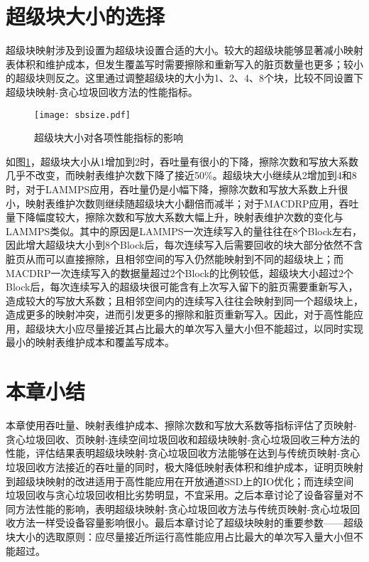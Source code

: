 \section{超级块大小的选择}

超级块映射涉及到设置为超级块设置合适的大小。较大的超级块能够显著减小映射表体积和维护成本，但发生覆盖写时需要擦除和重新写入的脏页数量也更多；较小的超级块则反之。这里通过调整超级块的大小为1、2、4、8个块，比较不同设置下超级块映射-贪心垃圾回收方法的性能指标。

\begin{figure}[H]
    \centering
    \texttt{[image: sbsize.pdf]}
    \caption{超级块大小对各项性能指标的影响}
    \label{fig:res_sbsize}
\end{figure}

如图\ref{fig:res_sbsize}，超级块大小从1增加到2时，吞吐量有很小的下降，擦除次数和写放大系数几乎不改变，而映射表维护次数下降了接近50\%。超级块大小继续从2增加到4和8时，对于LAMMPS应用，吞吐量仍是小幅下降，擦除次数和写放大系数上升很小，映射表维护次数则继续随超级块大小翻倍而减半；对于MACDRP应用，吞吐量下降幅度较大，擦除次数和写放大系数大幅上升，映射表维护次数的变化与LAMMPS类似。其中的原因是LAMMPS一次连续写入的量往往在8个Block左右，因此增大超级块大小到8个Block后，每次连续写入后需要回收的块大部分依然不含脏页从而可以直接擦除，且相邻空间的写入仍然能映射到不同的超级块上；而MACDRP一次连续写入的数据量超过2个Block的比例较低，超级块大小超过2个Block后，每次连续写入的超级块很可能含有上次写入留下的脏页需要重新写入，造成较大的写放大系数；且相邻空间内的连续写入往往会映射到同一个超级块上，造成更多的映射冲突，进而引发更多的擦除和脏页重新写入。因此，对于高性能应用，超级块大小应尽量接近其占比最大的单次写入量大小但不能超过，以同时实现最小的映射表维护成本和覆盖写成本。

\section{本章小结}

本章使用吞吐量、映射表维护成本、擦除次数和写放大系数等指标评估了页映射-贪心垃圾回收、页映射-连续空间垃圾回收和超级块映射-贪心垃圾回收三种方法的性能，评估结果表明超级块映射-贪心垃圾回收方法能够在达到与传统页映射-贪心垃圾回收方法接近的吞吐量的同时，极大降低映射表体积和维护成本，证明页映射到超级块映射的改进适用于高性能应用在开放通道SSD上的IO优化；而连续空间垃圾回收与贪心垃圾回收相比劣势明显，不宜采用。之后本章讨论了设备容量对不同方法性能的影响，表明超级块映射-贪心垃圾回收方法与传统页映射-贪心垃圾回收方法一样受设备容量影响很小。最后本章讨论了超级块映射的重要参数——超级块大小的选取原则：应尽量接近所运行高性能应用占比最大的单次写入量大小但不能超过。